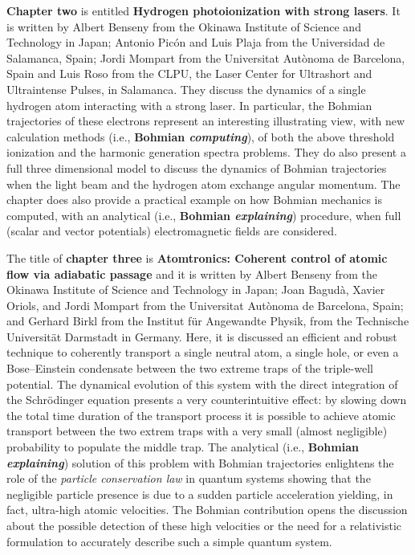 \documentclass[nofootinbib, secnumarabic, amsmath, nobibnotes,10pt,aps,pra]{revtex4-1}
\begin{document}
\textbf{Chapter two} is entitled \textbf{Hydrogen photoionization with strong lasers}. It is written by Albert Benseny from the Okinawa Institute of Science and Technology in Japan; Antonio Pic\'on and Luis Plaja from the Universidad de Salamanca, Spain; Jordi Mompart from the Universitat Aut\`{o}noma de Barcelona, Spain and Luis Roso from the CLPU, the Laser Center for Ultrashort and Ultraintense Pulses, in Salamanca. They discuss the dynamics of a single hydrogen atom interacting with a strong laser. In particular, the Bohmian trajectories of these electrons represent an interesting illustrating view, with new calculation methods (i.e., \textbf{Bohmian \emph{computing}}), of both  the above threshold ionization and the harmonic generation spectra problems. They do also present a full three dimensional model to discuss the dynamics of Bohmian trajectories when the light beam and the hydrogen atom exchange angular momentum. The chapter does also provide a practical example on how Bohmian mechanics is computed, with an analytical (i.e., \textbf{Bohmian \emph{explaining}}) procedure, when full (scalar and vector potentials) electromagnetic fields are considered.

The title of \textbf{chapter three} is \textbf{Atomtronics: Coherent control of atomic flow via adiabatic passage} and it is written by Albert Benseny from the Okinawa Institute of Science and Technology in Japan; Joan Bagud\`{a}, Xavier Oriols, and Jordi Mompart from the Universitat Aut\`{o}noma de Barcelona, Spain; and Gerhard Birkl from the Institut f\"ur Angewandte Physik, from the Technische Universit\"at Darmstadt in Germany. Here, it is discussed an efficient and robust technique to coherently transport a single neutral atom, a single hole, or even a Bose--Einstein condensate between the two extreme traps of the triple-well potential. The dynamical evolution of this system with the direct integration of the Schr\"odinger equation presents a very counterintuitive effect: by slowing down the total time duration of the transport process it is possible to achieve atomic transport between the two extrem traps with a very small (almost negligible) probability to populate the middle trap. The analytical (i.e., \textbf{Bohmian \emph{explaining}}) solution of this problem with Bohmian trajectories enlightens the role of the \emph{particle conservation law} in quantum systems showing that the negligible particle presence is due to a sudden particle acceleration yielding, in fact, ultra-high atomic velocities. The Bohmian contribution opens the discussion about the possible detection of these high velocities or the need for a relativistic formulation to accurately describe such a simple quantum system.
\end{document}

